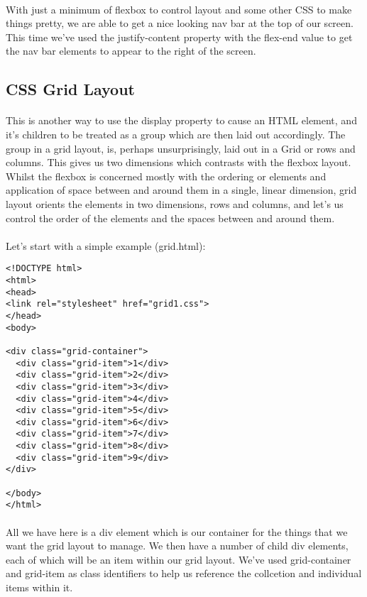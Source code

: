 \documentclass[10pt, a4paper, twosize]{article}
\begin{document}
\paragraph{} With just a minimum of flexbox to control layout and some other CSS to make things pretty, we are able to get a nice looking nav bar at the top of our screen. This time we've used the justify-content property with the flex-end value to get the nav bar elements to appear to the right of the screen.

\subsection*{CSS Grid Layout}
\paragraph{} This is another way to use the display property to cause an HTML element, and it's children to be treated as a group which are then laid out accordingly. The group in a grid layout, is, perhaps unsurprisingly, laid out in a Grid or rows and columns. This gives us two dimensions which contrasts with the flexbox layout. Whilst the flexbox is concerned mostly with the ordering or elements and application of space between and around them in a single, linear dimension, grid layout orients the elements in two dimensions, rows and columns, and let's us control the order of the elements and the spaces between and around them.

\paragraph{} Let's start with a simple example (grid.html):
\begin{lstlisting}
<!DOCTYPE html>
<html>
<head>
<link rel="stylesheet" href="grid1.css">
</head>
<body>

<div class="grid-container">
  <div class="grid-item">1</div>
  <div class="grid-item">2</div>
  <div class="grid-item">3</div>  
  <div class="grid-item">4</div>
  <div class="grid-item">5</div>
  <div class="grid-item">6</div>  
  <div class="grid-item">7</div>
  <div class="grid-item">8</div>
  <div class="grid-item">9</div>
</div>

</body>
</html>
\end{lstlisting}
\paragraph{} All we have here is a div element which is our container for the things that we want the grid layout to manage. We then have a number of child div elements, each of which will be an item within our grid layout. We've used grid-container and grid-item as class identifiers to help us reference the collcetion and individual items within it.
\end{document}
